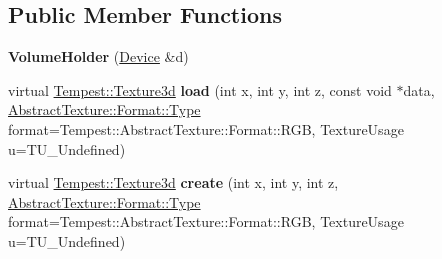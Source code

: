 \subsection*{Public Member Functions}
\begin{DoxyCompactItemize}
\item 
\hypertarget{class_tempest_1_1_volume_holder_aa4363f05c6713286fdfac1d31ff15d2c}{{\bfseries Volume\+Holder} (\hyperlink{class_tempest_1_1_device}{Device} \&d)}\label{class_tempest_1_1_volume_holder_aa4363f05c6713286fdfac1d31ff15d2c}

\item 
\hypertarget{class_tempest_1_1_volume_holder_a87afac0da5f1b80f3910d90d2948a138}{virtual \hyperlink{class_tempest_1_1_texture3d}{Tempest\+::\+Texture3d} {\bfseries load} (int x, int y, int z, const void $\ast$data, \hyperlink{struct_tempest_1_1_abstract_texture_1_1_format_a231a1f516e53783bf72c713669b115b3}{Abstract\+Texture\+::\+Format\+::\+Type} format=Tempest\+::\+Abstract\+Texture\+::\+Format\+::\+R\+G\+B, Texture\+Usage u=T\+U\+\_\+\+Undefined)}\label{class_tempest_1_1_volume_holder_a87afac0da5f1b80f3910d90d2948a138}

\item 
\hypertarget{class_tempest_1_1_volume_holder_a2e525d8024c8f644292717896885ce19}{virtual \hyperlink{class_tempest_1_1_texture3d}{Tempest\+::\+Texture3d} {\bfseries create} (int x, int y, int z, \hyperlink{struct_tempest_1_1_abstract_texture_1_1_format_a231a1f516e53783bf72c713669b115b3}{Abstract\+Texture\+::\+Format\+::\+Type} format=Tempest\+::\+Abstract\+Texture\+::\+Format\+::\+R\+G\+B, Texture\+Usage u=T\+U\+\_\+\+Undefined)}\label{class_tempest_1_1_volume_holder_a2e525d8024c8f644292717896885ce19}

\end{DoxyCompactItemize}
